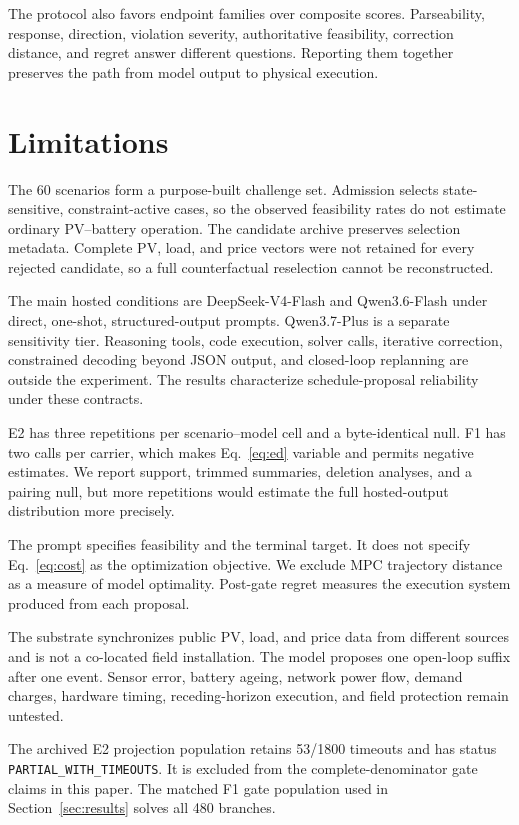 \documentclass[11pt]{article}
\newcommand{\EIIProjectionTimeouts}{53}
\newcommand{\EIIProjectionRows}{1800}
\begin{document}
The protocol also favors endpoint families over composite scores. Parseability, response,
direction, violation severity, authoritative feasibility, correction distance, and regret answer
different questions. Reporting them together preserves the path from model output to physical
execution.

\section{Limitations}
\label{sec:limitations}

The 60 scenarios form a purpose-built challenge set. Admission selects state-sensitive,
constraint-active cases, so the observed feasibility rates do not estimate ordinary PV--battery
operation. The candidate archive preserves selection metadata. Complete PV, load, and price vectors were
not retained for every rejected candidate, so a full counterfactual reselection cannot be
reconstructed.

The main hosted conditions are DeepSeek-V4-Flash and Qwen3.6-Flash under direct, one-shot,
structured-output prompts. Qwen3.7-Plus is a separate sensitivity tier. Reasoning tools, code
execution, solver calls, iterative correction, constrained decoding beyond JSON output, and
closed-loop replanning are outside the experiment. The results characterize schedule-proposal
reliability under these contracts.

E2 has three repetitions per scenario--model cell and a byte-identical null. F1 has two calls per
carrier, which makes Eq.~\eqref{eq:ed} variable and permits negative estimates. We report support,
trimmed summaries, deletion analyses, and a pairing null, but more repetitions would estimate the
full hosted-output distribution more precisely.

The prompt specifies feasibility and the terminal target. It does not specify Eq.~\eqref{eq:cost}
as the optimization objective. We exclude MPC trajectory distance as a measure of model
optimality.
Post-gate regret measures the execution system produced from each proposal.

The substrate synchronizes public PV, load, and price data from different sources and is not a
co-located field installation. The model proposes one open-loop suffix after one event. Sensor
error, battery ageing, network power flow, demand charges, hardware timing, receding-horizon
execution, and field protection remain untested.

The archived E2 projection population retains \EIIProjectionTimeouts{}/\EIIProjectionRows{}
timeouts and has status \texttt{PARTIAL\_WITH\_TIMEOUTS}. It is excluded from the complete-denominator
gate claims in this paper. The matched F1 gate population used in Section~\ref{sec:results} solves
all 480 branches.
\end{document}
